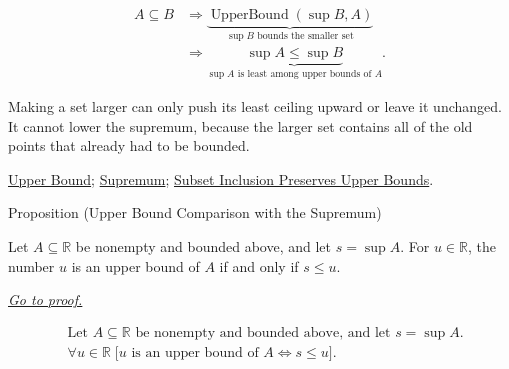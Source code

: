 \begin{remark*}
\[
\begin{aligned}
A\subseteq B
&\Longrightarrow
\underbrace{\operatorname{UpperBound}(\sup B,A)}_{\sup B\text{ bounds the smaller set}}\\
&\Longrightarrow
\underbrace{\sup A\le \sup B}_{\sup A\text{ is least among upper bounds of }A}.
\end{aligned}
\]
\end{remark*}

\begin{remark*}[Interpretation]
Making a set larger can only push its least ceiling upward or leave it unchanged. It cannot lower the supremum, because the larger set contains all of the old points that already had to be bounded.
\end{remark*}

\begin{dependencies}
\hyperref[def:upper-bound]{Upper Bound};
\hyperref[def:supremum]{Supremum};
\hyperref[lem:subset-inclusion-preserves-upper-bounds]{Subset Inclusion Preserves Upper Bounds}.
\end{dependencies}


\begin{propositionbox}{Proposition (Upper Bound Comparison with the Supremum)}
\begin{proposition}
\label{prop:upper-bound-comparison-with-the-supremum}
Let $A\subseteq\mathbb{R}$ be nonempty and bounded above, and let $s=\sup A$. For $u\in\mathbb{R}$, the number $u$ is an upper bound of $A$ if and only if $s\le u$.

\smallskip
\noindent
\hyperref[prf:upper-bound-comparison-with-the-supremum]{\textit{Go to proof.}}
\end{proposition}
\end{propositionbox}

\begin{remark*}
\[
\begin{aligned}
&\text{Let }A\subseteq\mathbb{R}\text{ be nonempty and bounded above, and let }s=\sup A.\\
&\forall u\in\mathbb{R}\;
\bigl[u\text{ is an upper bound of }A
\Longleftrightarrow
s\le u\bigr].
\end{aligned}
\]
\end{remark*}

